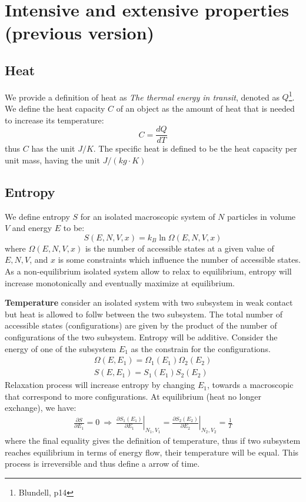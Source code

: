\documentclass{article}
\begin{document}
\section{Intensive and extensive properties (previous version)}

\subsection{Heat}
We provide a definition of heat as \emph{The thermal energy in transit}, denoted as $Q$\footnote{Blundell, p14}. We define the heat capacity
$C$ of an object as the amount of heat that is needed to increase its temperature:
\begin{equation}
    C = \frac{dQ}{dT}
\end{equation}
thus $C$ has the unit $J/K$. The specific heat is defined to be the heat capacity per unit mass, having the unit $J/(kg\cdot K)$

\subsection{Entropy}
We define entropy $S$ for an isolated macroscopic system of $N$ particles in volume $V$ and energy $E$ to be:
\begin{equation}
    S(E,N,V,x) = k_B \ln\Omega(E,N,V,x)
\end{equation}
where $\Omega(E,N,V,x)$ is the number of accessible states at a given value of $E, N, V$, and $x$ is some constraints which 
influence the number of accessible states.
As a non-equilibrium isolated system allow to relax to equilibrium, entropy will increase monotonically and eventually maximize 
at equilibrium.

\textbf{Temperature} 
consider an isolated system with two subsystem in weak contact but heat is allowed to follw between the two subsystem.
The total number of accessible states (configurations) are given by the product of the number of configurations of the 
two subsystem. Entropy will be additive. Consider the energy of one of the subsystem $E_1$
as the constrain for the configurations.
\begin{align}
    \Omega(E,E_1) = \Omega_1(E_1) \Omega_2(E_2) \\
    S(E,E_1) = S_1(E_1) S_2(E_2)   
\end{align}
Relaxation process will increase entropy by changing $E_1$, towards a macroscopic that correspond to 
more configurations. At equilibrium (heat no longer exchange), we have:
\begin{gather}
    \frac{\partial S}{\partial E_1} = 0 \ \Rightarrow \ 
    \left. \frac{\partial S_1(E_1)}{\partial E_1} \right|_{N_1,V_1} = \left. \frac{\partial S_2(E_2)}{\partial E_2}\right|_{N_2,V_2} = \frac{1}{T} \label{defineT}
\end{gather}
where the final equality gives the definition of temperature, thus if two subsystem reaches equilibrium in terms of energy flow, their 
temperature will be equal. This process is irreversible and thus define a arrow of time.
\end{document}
